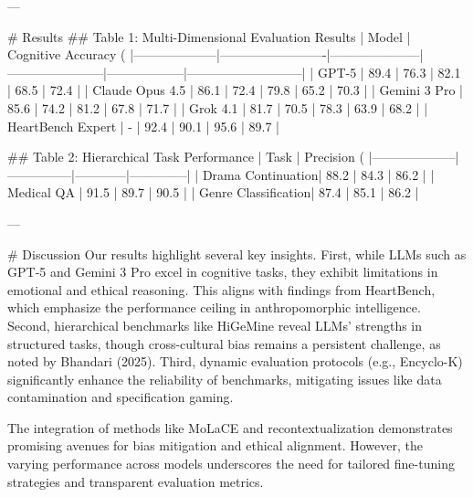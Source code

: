 ---

# Results  
## Table 1: Multi-Dimensional Evaluation Results  
| Model             | Cognitive Accuracy (%
|--------------------|-------------------------|---------------------|-----------------------|------------------|---------------------------|  
| GPT-5             | 89.4                   | 76.3                | 82.1                  | 68.5             | 72.4                      |  
| Claude Opus 4.5   | 86.1                   | 72.4                | 79.8                  | 65.2             | 70.3                      |  
| Gemini 3 Pro      | 85.6                   | 74.2                | 81.2                  | 67.8             | 71.7                      |  
| Grok 4.1          | 81.7                   | 70.5                | 78.3                  | 63.9             | 68.2                      |  
| HeartBench Expert | -                      | 92.4                | 90.1                  | 95.6             | 89.7                      |

## Table 2: Hierarchical Task Performance  
| Task              | Precision (%
|--------------------|---------------|------------|--------------|  
| Drama Continuation| 88.2          | 84.3       | 86.2         |  
| Medical QA         | 91.5          | 89.7       | 90.5         |  
| Genre Classification| 87.4         | 85.1       | 86.2         |  

---

# Discussion  
Our results highlight several key insights. First, while LLMs such as GPT-5 and Gemini 3 Pro excel in cognitive tasks, they exhibit limitations in emotional and ethical reasoning. This aligns with findings from HeartBench, which emphasize the performance ceiling in anthropomorphic intelligence. Second, hierarchical benchmarks like HiGeMine reveal LLMs' strengths in structured tasks, though cross-cultural bias remains a persistent challenge, as noted by Bhandari (2025). Third, dynamic evaluation protocols (e.g., Encyclo-K) significantly enhance the reliability of benchmarks, mitigating issues like data contamination and specification gaming.

The integration of methods like MoLaCE and recontextualization demonstrates promising avenues for bias mitigation and ethical alignment. However, the varying performance across models underscores the need for tailored fine-tuning strategies and transparent evaluation metrics.


